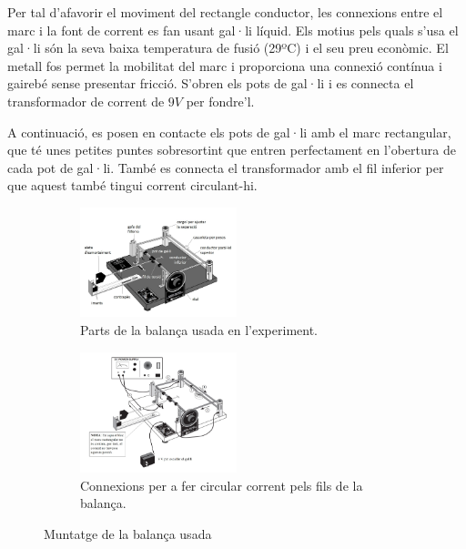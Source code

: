 \documentclass[11pt]{article}
\numberwithin{equation}{section}
\numberwithin{figure}{section}
\numberwithin{table}{section}
\begin{document}
Per tal d'afavorir el moviment del rectangle conductor, les connexions entre el marc i la font de corrent es fan usant gal·li líquid. Els motius pels quals s'usa el gal·li són la seva baixa temperatura de fusió (29ºC) i el seu preu econòmic. El metall fos permet la mobilitat del marc i proporciona una connexió contínua i gairebé sense presentar fricció. S'obren els pots de gal·li i es connecta el transformador de corrent de $9 V$ per fondre'l. 

A continuació, es posen en contacte els pots de gal·li amb el marc rectangular, que té unes petites puntes sobresortint que entren perfectament en l'obertura de cada pot de gal·li. També es connecta el transformador amb el fil inferior per que aquest també tingui corrent circulant-hi.


\begin{figure}[H]
    \centering
    \begin{subfigure}{0.4\textwidth}
        \centering
        \includegraphics[width=0.5\textwidth]{PR2_dib_muntatge_parts.jpg}
        \caption{Parts de la balança usada en l'experiment.}
        \label{fig: PR2_dib_muntatge_parts}
    \end{subfigure}
    \hspace{0.1\textwidth}
    \begin{subfigure}{0.4\textwidth}
        \centering
        \includegraphics[width=0.5\textwidth]{PR2_dib_muntatge_corrent.jpg}
        \caption{Connexions per a fer circular corrent pels fils de la balança.}
        \label{fig: PR2_dib_muntatge_corrent}
    \end{subfigure}
\caption{Muntatge de la balança usada}
\end{figure}
\end{document}
